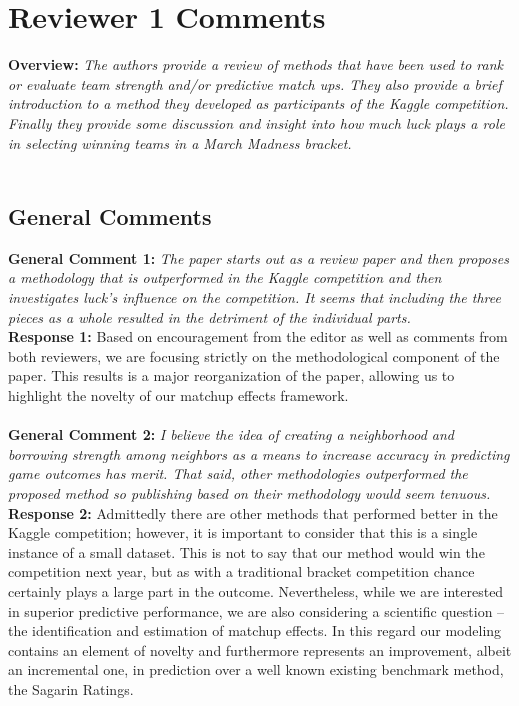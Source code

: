 \documentclass[11pt]{article} %
\begin{document}
\section*{Reviewer 1 Comments}
{\bf Overview:} \emph{The authors provide a review of methods that have been used to rank or evaluate team strength and/or predictive match ups. They also provide a brief introduction to a method they developed as participants of the Kaggle competition. Finally they provide some discussion and insight into how much luck plays a role in selecting winning teams in a March Madness bracket.}\\
\\
\subsection*{General Comments}
{\bf General Comment 1:} \emph{The paper starts out as a review paper and then proposes a methodology that is outperformed in the Kaggle competition and then investigates luck's influence on the competition. It seems that including the three pieces as a whole resulted in the detriment of the individual parts.}\\
{\bf Response 1:} Based on encouragement from the editor as well as comments from both reviewers, we are focusing strictly on the methodological component of the paper. This results is a major reorganization of the paper, allowing us to highlight the novelty of our matchup effects framework.\\
\\
{\bf General Comment 2:} \emph{I believe the idea of creating a neighborhood and borrowing strength among neighbors as a means to increase accuracy in predicting game outcomes has merit. That said, other methodologies outperformed the proposed method so publishing based on their methodology would seem tenuous.}\\
{\bf Response 2:} Admittedly there are other methods that performed better in the Kaggle competition; however, it is important to consider that this is a single instance of a small dataset. This is not to say that our method would win the competition next year, but as with a traditional bracket competition chance certainly plays a large part in the outcome. Nevertheless, while we are interested in superior predictive performance, we are also considering a scientific question -- the identification and estimation of matchup effects. In this regard our modeling contains an element of novelty and furthermore represents an improvement, albeit an incremental one, in prediction over a well known existing benchmark method, the Sagarin Ratings.\\
\end{document}
